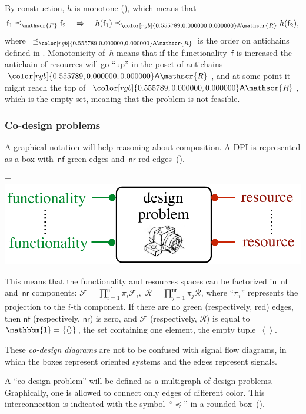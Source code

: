 \documentclass[twocolumn,english]{IEEEtran}
\theoremstyle{definition}
\theoremstyle{plain}
\theoremstyle{definition}
\theoremstyle{remark}
\theoremstyle{definition}
\theoremstyle{plain}
\theoremstyle{plain}
\newcommand{\aword}[1]{\mathsf{#1}}
\newcommand{\vmath}[1]{\aword{#1}}
\newcommand{\posleq}{\preceq}
\newcommand{\antichains}{\vmath{A}}
\newcommand{\ftor}{{h}}
\newcommand{\funsp}{\mathscr{F}}
\newcommand{\funleq}{\posleq_{\funsp}}
\newcommand{\fun}{\vmath{f}}
\newcommand{\ressp}{\mathscr{R}}
\newcommand{\Aressp}{{\antichains\ressp}}
\newcommand{\colR}{\color[rgb]{0.555789,0.000000,0.000000}}
\newcommand{\One}{\mathbbm{1}}
\newcommand{\dpinumf}{\vmath{nf}}
\newcommand{\dpinumr}{\vmath{nr}}
\newcommand*{\vcenteredhbox}[1]{\begingroup
\setbox0=\hbox{#1}\parbox{\wd0}{\box0}\endgroup}
\newcommand{\captionsideleft}[2]{
    \medskip
    \begin{minipage}{1.8cm}{
        \hfill
        \protect\captionof{figure}{#1}}\end{minipage}
    \begin{minipage}{6.6cm}
    
    \vcenteredhbox{{#2}}
    \hfill
    \end{minipage}
    \medskip
}
\renewcommand{\Aressp}{{\colR\antichains\ressp}}
\begin{document}
By construction, $\ftor$ is monotone (), which
means that
\[
\fun_{1}\funleq\fun_{2}\quad\Rightarrow\quad\ftor(\fun_{1})\posleq_{\Aressp}\ftor(\fun_{2}),
\]
where~$\posleq_{\Aressp}$ is the order on antichains defined in
. Monotonicity of~$\ftor$ means that
if the functionality~$\fun$ is increased the antichain of resources
will go ``up'' in the poset of antichains~$\Aressp$, and at some
point it might reach the top of~$\Aressp$, which is the empty set,
meaning that the problem is not feasible.



\subsubsection{Co-design problems\label{sec:Co-design-problems}}

A graphical notation will help reasoning about composition. A DPI
is represented as a box with~$\dpinumf$ green edges and~$\dpinumr$
red edges~().

\captionsideleft{\label{fig:dp_graphical}}{\includegraphics[scale=0.33]{gmcdp_dp_graphical}}

\noindent This means that the functionality and resources spaces
can be factorized in~$\dpinumf$ and~$\dpinumr$ components: $\funsp=\prod_{i=1}^{\dpinumf}\pi_{i}\funsp_{i},$
$\ressp=\prod_{j=1}^{\dpinumr}\pi_{j}\ressp$, where ``$\pi_{i}$''
represents the projection to the $i$-th component. If there are no
green (respectively, red) edges, then $\dpinumf$ (respectively, $\dpinumr$)
is zero, and $\funsp$ (respectively, $\ressp$) is equal to~$\One=\{\left\langle \right\rangle \}$,
the set containing one element, the empty tuple~$\left\langle \right\rangle $.

These \emph{co-design diagrams} are not to be confused with signal
flow diagrams, in which the boxes represent oriented systems and the
edges represent signals.

A ``co-design problem'' will be defined as a multigraph of design
problems. Graphically, one is allowed to connect only edges of different
color. This interconnection is indicated with the symbol~``$\posleq$''
in a rounded box~(). 
\end{document}
